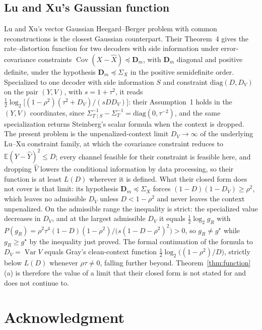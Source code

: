\documentclass[11pt,onecolumn]{IEEEtran}
\newcommand{\E}{\mathbb{E}}
\newcommand{\Cov}{\operatorname{Cov}}
\newcommand{\hX}{\widehat{X}}
\newcommand{\hY}{\widehat{Y}}
\begin{document}
\subsection*{Lu and Xu's Gaussian function}

Lu and Xu's vector Gaussian Heegard--Berger problem with common
reconstructions \cite{luxu2021} is the closest Gaussian counterpart. Their Theorem~4 gives the rate--distortion function
for two decoders with side information under error-covariance
constraints $\Cov(X-\hX)\preceq\mathbf D_m$, with $\mathbf D_m$ diagonal
and positive definite, under the hypothesis $\mathbf D_m\preceq\Sigma_X$
in the positive semidefinite order. Specialized to one decoder with side
information $S$ and constraint $\mathrm{diag}(D,D_V)$ on the pair
$(Y,V)$, with $s=1+\tau^2$, it reads
$\tfrac12\log_2\bigl[(1-\rho^2)(\tau^2+D_V)/(sDD_V)\bigr]$: their
Assumption~1 holds in the $(Y,V)$ coordinates, since
$\Sigma_{T\mid S}^{-1}-\Sigma_T^{-1}=\mathrm{diag}(0,\tau^{-2})$, and the
same specialization returns Steinberg's scalar formula when the context
is dropped. The present problem is the unpenalized-context limit $D_V\to\infty$ of
the underlying Lu--Xu constraint family,
at which the covariance constraint reduces to $\E(Y-\hY)^2\le D$; every
channel feasible for their constraint is feasible here, and dropping
$\hat V$ lowers the conditional information by data processing, so
their function is at least $L(D)$ wherever it is defined. What their
closed form does not cover is that limit: its hypothesis
$\mathbf D_m\preceq\Sigma_X$ forces $(1-D)(1-D_V)\ge\rho^2$, which leaves
no admissible $D_V$ unless $D<1-\rho^2$ and never leaves the context
unpenalized. On the admissible range the inequality is strict: the specialized
value decreases in $D_V$, and at the largest admissible $D_V$ it equals
$\tfrac12\log_2g_R$ with
$P(g_R)=\rho^2\tau^4(1-D)(1-\rho^2)/\bigl(s(1-D-\rho^2)^2\bigr)>0$, so
$g_R\ne g^\star$ while $g_R\ge g^\star$ by the inequality just proved.
The formal continuation of the formula to $D_V=\operatorname{Var}V$
equals Gray's clean-context function
$\tfrac12\log_2\bigl((1-\rho^2)/D\bigr)$, strictly below $L(D)$ whenever
$\rho\tau\ne0$, falling further beyond. Theorem~\ref{thm:function}(a)
is therefore the value of a limit that their closed form is not stated
for and does not continue to.

\section*{Acknowledgment}
\end{document}
